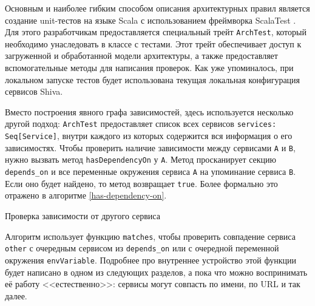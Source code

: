 Основным и наиболее гибким способом описания архитектурных правил является создание unit-тестов на языке Scala с использованием фреймворка ScalaTest \cite{scalatest-fw}. Для этого разработчикам предоставляется специальный трейт \verb|ArchTest|, который необходимо унаследовать в классе с тестами. Этот трейт обеспечивает доступ к загруженной и обработанной модели архитектуры, а также предоставляет вспомогательные методы для написания проверок. Как уже упоминалось, при локальном запуске тестов будет использована текущая локальная конфигурация сервисов Shiva.

Вместо построения явного графа зависимостей, здесь используется несколько другой подход: \verb|ArchTest| предоставляет список всех сервисов \verb|services: Seq[Service]|, внутри каждого из которых содержится вся информация о его зависимостях. Чтобы проверить наличие зависимости между сервисами \verb|A| и \verb|B|, нужно вызвать метод \verb|hasDependencyOn| у \verb|A|. Метод просканирует секцию \verb|depends_on| и все переменные окружения сервиса \verb|A| на упоминание сервиса \verb|B|. Если оно будет найдено, то метод возвращает \verb|true|. Более формально это отражено в алгоритме \ref{has-dependency-on}.

\begin{algorithm}[hbt!]
\caption{Проверка зависимости от другого сервиса}\label{has-dependency-on}

\end{algorithm}

Алгоритм использует функцию \verb|matches|, чтобы проверить совпадение сервиса \verb|other| с очередным сервисом из \verb|depends_on| или с очередной переменной окружения \verb|envVariable|. Подробнее про внутреннее устройство этой функции будет написано в одном из следующих разделов, а пока что можно воспринимать её работу <<естественно>>: сервисы могут совпасть по имени, по URL и так далее.

